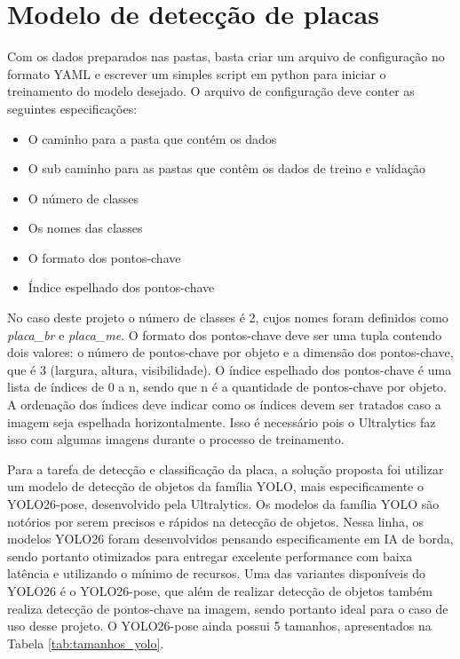 \section{Modelo de detecção de placas}
Com os dados preparados nas pastas, basta criar um arquivo de configuração no formato YAML e escrever um simples script em python para iniciar o treinamento do modelo desejado. O arquivo de configuração deve conter as seguintes especificações:
\begin{itemize} 
\item O caminho para a pasta que contém os dados 
\item O sub caminho para as pastas que contêm os dados de treino e validação 
\item O número de classes 
\item Os nomes das classes 
\item O formato dos pontos-chave 
\item Índice espelhado dos pontos-chave 
\end{itemize}

No caso deste projeto o número de classes é 2, cujos nomes foram definidos como \textit{placa\_br} e \textit{placa\_me}. O formato dos pontos-chave deve ser uma tupla contendo dois valores: o número de pontos-chave por objeto e a dimensão dos pontos-chave, que é 3 (largura, altura, visibilidade). O índice espelhado dos pontos-chave é uma lista de índices de 0 a n, sendo que n é a quantidade de pontos-chave por objeto. A ordenação dos índices deve indicar como os índices devem ser tratados caso a imagem seja espelhada horizontalmente. Isso é necessário pois o Ultralytics faz isso com algumas imagens durante o processo de treinamento.

Para a tarefa de detecção e classificação da placa, a solução proposta foi utilizar um modelo de detecção de objetos da família YOLO, mais especificamente o YOLO26-pose, desenvolvido pela Ultralytics. Os modelos da família YOLO são notórios por serem precisos e rápidos na detecção de objetos. Nessa linha, os modelos YOLO26 foram desenvolvidos pensando especificamente em IA de borda, sendo portanto otimizados para entregar excelente performance com baixa latência e utilizando o mínimo de recursos. Uma das variantes disponíveis do YOLO26 é o YOLO26-pose, que além de realizar detecção de objetos também realiza detecção de pontos-chave na imagem, sendo portanto ideal para o caso de uso desse projeto. O YOLO26-pose ainda possui 5 tamanhos, apresentados na Tabela \ref{tab:tamanhos_yolo}.

